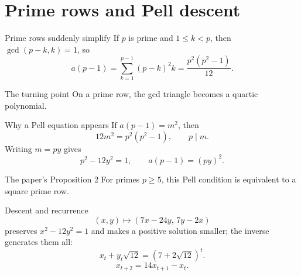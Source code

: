 \documentclass{beamer}
\begin{document}
\section[Pell mechanism]{Prime rows and Pell descent}
\begin{frame}{Prime rows suddenly simplify}
  If $p$ is prime and $1\le k<p$, then $\gcd(p-k,k)=1$, so
  \[
  a(p-1)=\sum_{k=1}^{p-1}(p-k)^2k
  =\frac{p^2(p^2-1)}{12}.
  \]
  \begin{alertblock}{The turning point}
    On a prime row, the gcd triangle becomes a quartic polynomial.
  \end{alertblock}
\end{frame}
\begin{frame}{Why a Pell equation appears}
  If $a(p-1)=m^2$, then
  \[
  12m^2=p^2(p^2-1),\qquad p\mid m.
  \]
  Writing $m=py$ gives
  \[
  p^2-12y^2=1,\qquad a(p-1)=(py)^2.
  \]
  \begin{block}{The paper's Proposition 2}
    For primes $p\ge5$, this Pell condition is equivalent to a square prime row.
  \end{block}
\end{frame}
\begin{frame}{Descent and recurrence}
  \[
  (x,y)\mapsto(7x-24y,\,7y-2x)
  \]
  preserves $x^2-12y^2=1$ and makes a positive solution smaller; the inverse generates them all:
  \[
  x_t+y_t\sqrt{12}=(7+2\sqrt{12})^t.
  \]
  \[
  x_{t+2}=14x_{t+1}-x_t.
  \]
\end{frame}
\end{document}
